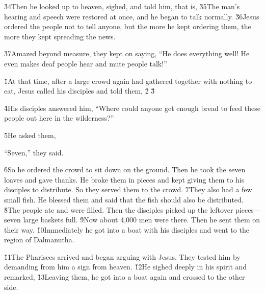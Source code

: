\v{34}Then he looked up to heaven, sighed, and told him,  that is,  \v{35}The man's hearing and speech were restored at once, and he began to talk normally. \v{36}Jesus ordered the people not to tell anyone, but the more he kept ordering them, the more they kept spreading the news.

\v{37}Amazed beyond measure, they kept on saying, ``He does everything well! He even makes deaf people hear and mute people talk!''

\v{1}At that time, after a large crowd again had gathered together with nothing to eat, Jesus called his disciples and told them, \v{2} \v{3}

\v{4}His disciples answered him, ``Where could anyone get enough bread to feed these people out here in the wilderness?''

\v{5}He asked them, 

``Seven,'' they said.

\v{6}So he ordered the crowd to sit down on the ground. Then he took the seven loaves and gave thanks. He broke them in pieces and kept giving them to his disciples to distribute. So they served them to the crowd. \v{7}They also had a few small fish. He blessed them and said that the fish should also be distributed. \v{8}The people ate and were filled. Then the disciples picked up the leftover pieces---seven large baskets full. \v{9}Now about 4,000 men were there. Then he sent them on their way. \v{10}Immediately he got into a boat with his disciples and went to the region of Dalmanutha.

\v{11}The Pharisees arrived and began arguing with Jesus. They tested him by demanding from him a sign from heaven. \v{12}He sighed deeply in his spirit and remarked,  \v{13}Leaving them, he got into a boat again and crossed to the other side.

